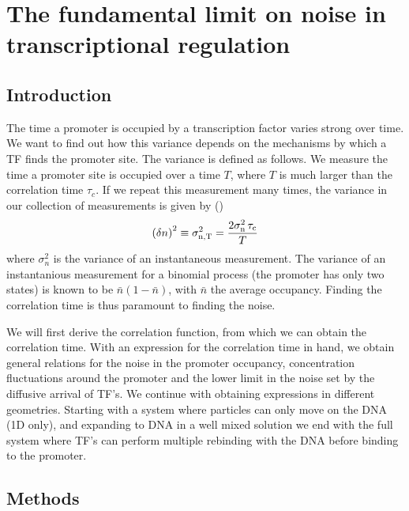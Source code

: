 \section{The fundamental limit on noise in transcriptional regulation}

\subsection{Introduction}
The time a promoter is occupied by a transcription factor varies strong over time. We want to find out how this variance depends on the mechanisms by which a TF finds the promoter site. The variance is defined as follows. We measure the time a promoter site is occupied over a time $T$, where $T$ is much larger than the correlation time $\tau_c$. If we repeat this measurement many times, the variance in our collection of measurements is given by ()
\begin{equation}
 \left( \delta n \right)^2 \equiv \sigma_{\rm n, T}^2 = \frac{2 \sigma_{\rm n}^2 \,\tau_{\rm c}}{T}
 \elabel{std_devT}
\end{equation}
where $\sigma_n^2$ is the variance of an instantaneous measurement. The variance of an instantanious measurement for a binomial process (the promoter has only two states) is known to be $\bar{n}(1-\bar{n})$, with $\bar{n}$ the average occupancy. Finding the correlation time is thus paramount to finding the noise.

We will first derive the correlation function, from which we can obtain the correlation time. With an expression for the correlation time in hand, we obtain general relations for the noise in the promoter occupancy, concentration fluctuations around the promoter and the lower limit in the noise set by the diffusive arrival of TF's. We continue with obtaining expressions in different geometries. Starting with a system where particles can only move on the DNA (1D only), and expanding to DNA in a well mixed solution we end with the full system where TF's can perform multiple rebinding with the DNA before binding to the promoter.


\subsection{Methods}

